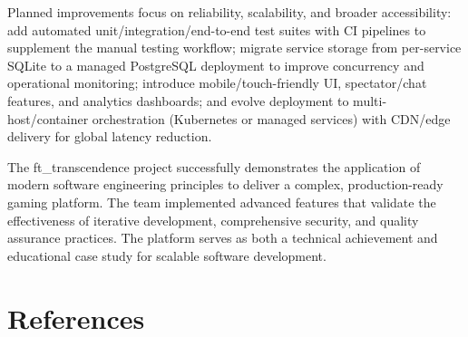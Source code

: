 \documentclass[11pt,a4paper]{report}
\begin{document}
Planned improvements focus on reliability, scalability, and broader accessibility: add automated unit/integration/end-to-end test suites with CI pipelines to supplement the manual testing workflow; migrate service storage from per-service SQLite to a managed PostgreSQL deployment to improve concurrency and operational monitoring; introduce mobile/touch-friendly UI, spectator/chat features, and analytics dashboards; and evolve deployment to multi-host/container orchestration (Kubernetes or managed services) with CDN/edge delivery for global latency reduction.

The ft\_transcendence project successfully demonstrates the application of modern software engineering principles to deliver a complex, production-ready gaming platform. The team implemented advanced features that validate the effectiveness of iterative development, comprehensive security, and quality assurance practices. The platform serves as both a technical achievement and educational case study for scalable software development.


\chapter*{References}
\label{app:references}

\begingroup
\renewcommand{\chapter}[2]{}
\end{document}
